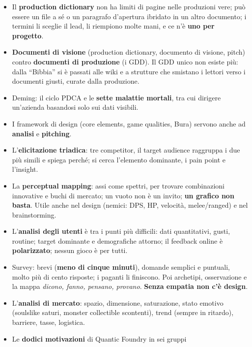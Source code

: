 \begin{itemize}
  \item Il \textbf{production dictionary} non ha limiti di pagine nelle
        produzioni vere; può essere un file a sé o un paragrafo d'apertura
        ibridato in un altro documento; i termini li sceglie il lead, li
        riempiono molte mani, e ce n'è \textbf{uno per progetto}.
  \item \textbf{Documenti di visione} (production dictionary, documento di
        visione, pitch) contro \textbf{documenti di produzione} (i GDD). Il
        GDD unico non esiste più: dalla ``Bibbia'' si è passati alle wiki e a
        strutture che smistano i lettori verso i documenti giusti, curate
        dalla produzione.
  \item Deming: il ciclo PDCA e le \textbf{sette malattie mortali}, tra cui
        dirigere un'azienda basandosi solo sui dati visibili.
  \item I framework di design (core elements, game qualities, Bura) servono
        anche ad \textbf{analisi} e \textbf{pitching}.
  \item L'\textbf{elicitazione triadica}: tre competitor, il target audience
        raggruppa i due più simili e spiega perché; si cerca l'elemento
        dominante, i pain point e l'insight.
  \item La \textbf{perceptual mapping}: assi come spettri, per trovare
        combinazioni innovative e buchi di mercato; un vuoto non è un invito;
        \textbf{un grafico non basta}. Utile anche nel design (nemici: DPS,
        HP, velocità, melee/ranged) e nel brainstorming.
  \item L'\textbf{analisi degli utenti} è tra i punti più difficili: dati
        quantitativi, gusti, routine; target dominante e demografiche
        attorno; il feedback online è \textbf{polarizzato}; nessun gioco è per
        tutti.
  \item Survey: brevi (\textbf{meno di cinque minuti}), domande semplici e
        puntuali, molto più di cento risposte; i paganti li finiscono. Poi
        archetipi, osservazione e la mappa \emph{dicono, fanno, pensano,
        provano}. \textbf{Senza empatia non c'è design}.
  \item L'\textbf{analisi di mercato}: spazio, dimensione, saturazione, stato
        emotivo (soulslike saturi, monster collectible scontenti), trend
        (sempre in ritardo), barriere, tasse, logistica.
  \item Le \textbf{dodici motivazioni} di Quantic Foundry in sei gruppi

\end{itemize}
